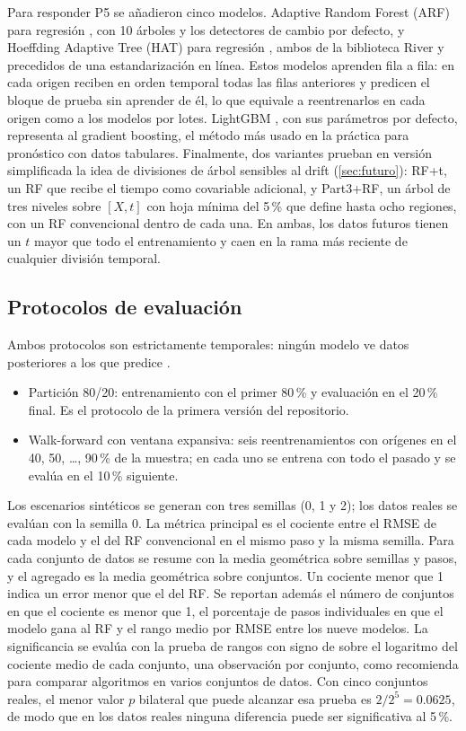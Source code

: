 \documentclass[11pt,a4paper]{article}
\begin{document}
Para responder P5 se añadieron cinco modelos. Adaptive Random Forest (ARF) para regresión
\parencite{gomes2017}, con 10 árboles y los detectores de cambio por defecto, y Hoeffding Adaptive Tree
(HAT) para regresión \parencite{bifet2009}, ambos de la biblioteca River \parencite{montiel2021} y
precedidos de una estandarización en línea. Estos modelos aprenden fila a fila: en cada origen reciben
en orden temporal todas las filas anteriores y predicen el bloque de prueba sin aprender de él, lo que
equivale a reentrenarlos en cada origen como a los modelos por lotes. LightGBM \parencite{ke2017}, con
sus parámetros por defecto, representa al gradient boosting, el método más usado en la práctica para
pronóstico con datos tabulares. Finalmente, dos variantes prueban en versión simplificada la idea de
divisiones de árbol sensibles al drift (\cref{sec:futuro}): RF+t, un RF que recibe el tiempo como
covariable adicional, y Part3+RF, un árbol de tres niveles sobre $[X,t]$ con hoja mínima del 5\,\%
que define hasta ocho regiones, con un RF convencional dentro de cada una. En ambas, los datos futuros
tienen un $t$ mayor que todo el entrenamiento y caen en la rama más reciente de cualquier división
temporal.

\subsection{Protocolos de evaluación}

Ambos protocolos son estrictamente temporales: ningún modelo ve datos posteriores a los que predice
\parencite{tashman2000}.
\begin{itemize}
  \item Partición 80/20: entrenamiento con el primer 80\,\% y evaluación en el 20\,\% final. Es el
  protocolo de la primera versión del repositorio.
  \item Walk-forward con ventana expansiva: seis reentrenamientos con orígenes en el 40, 50, \ldots,
  90\,\% de la muestra; en cada uno se entrena con todo el pasado y se evalúa en el 10\,\% siguiente.
\end{itemize}

Los escenarios sintéticos se generan con tres semillas (0, 1 y 2); los datos reales se evalúan con la
semilla 0. La métrica principal es el cociente entre el RMSE de cada modelo y el del RF convencional
en el mismo paso y la misma semilla. Para cada conjunto de datos se resume con la media geométrica
sobre semillas y pasos, y el agregado es la media geométrica sobre conjuntos. Un cociente menor que 1
indica un error menor que el del RF. Se reportan además el número de conjuntos en que el cociente es
menor que 1, el porcentaje de pasos individuales en que el modelo gana al RF y el rango medio por
RMSE entre los nueve modelos. La significancia se evalúa con la prueba de rangos con signo de
\textcite{wilcoxon1945} sobre el logaritmo del cociente medio de cada conjunto, una observación por
conjunto, como recomienda \textcite{demsar2006} para comparar algoritmos en varios conjuntos de
datos. Con cinco conjuntos reales, el menor valor $p$ bilateral que puede alcanzar esa prueba es
$2/2^5=0.0625$, de modo que en los datos reales ninguna diferencia puede ser significativa al 5\,\%.
\end{document}
